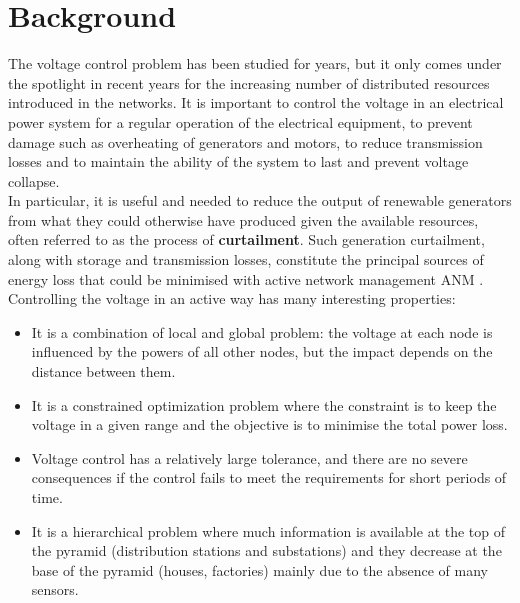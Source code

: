 \chapter{Background}

The voltage control problem has been studied for years, but it only comes under the spotlight in recent years for the increasing number of distributed resources introduced in the networks. It is important to control the voltage in an electrical power system for a regular operation of the electrical equipment, to prevent damage such as overheating of generators and motors, to reduce transmission losses and to maintain the ability of the system to last and prevent voltage collapse. \\

In particular, it is useful and needed to reduce the output of renewable generators from what they could otherwise have produced given the available resources, often referred to as the process of \textbf{curtailment}. Such generation curtailment, along with storage and transmission losses, constitute the principal sources of energy loss that could be minimised with active network management \gls{ANM} \cite{gym-anm}. \\

\noindent Controlling the voltage in an active way has many interesting properties:
\begin{itemize}
    \item It is a combination of local and global problem: the voltage at each node is influenced by the powers of all other nodes, but the impact depends on the distance between them.
    \item It is a constrained optimization problem where the constraint is to keep the voltage in a given range and the objective is to minimise the total power loss.
    \item Voltage control has a relatively large tolerance, and there are no severe consequences if the control fails to meet the requirements for short periods of time. \cite{wang2022multiagent}
    \item It is a hierarchical problem where much information is available at the top of the pyramid (distribution stations and substations) and they decrease at the base of the pyramid (houses, factories) mainly due to the absence of many sensors.
\end{itemize}

